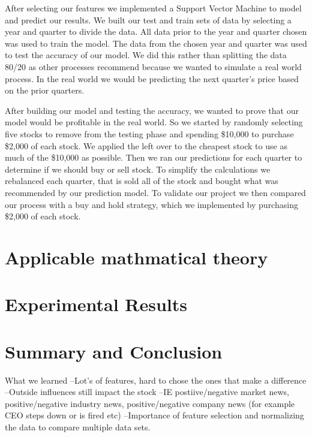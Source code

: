 \documentclass[conference]{IEEEtran}
\begin{document}
After selecting our features we implemented a Support Vector Machine to model and predict our results.  We built our test and train sets of data by selecting a year and quarter to divide the data.  All data prior to the year and quarter chosen was used to train the model. The data from the chosen year and quarter was used to test the accuracy of our model.  We did this rather than splitting the data 80/20 as other processes recommend because we wanted to simulate a real world process.  In the real world we would be predicting the next quarter's price based on the prior quarters.  

After building our model and testing the accuracy, we wanted to prove that our model would be profitable in the real world.  So we started by randomly selecting five stocks to remove from the testing phase and spending \$10,000 to purchase \$2,000 of each stock.  We applied the left over to the cheapest stock to use as much of the \$10,000 as possible. Then we ran our predictions for each quarter to determine if we should buy or sell stock.  To simplify the calculations we rebalanced each quarter, that is sold all of the stock and bought what was recommended by our prediction model.  To validate our project we then compared our process with a buy and hold strategy, which we implemented by purchasing \$2,000 of each stock.

\section{Applicable mathmatical theory}

\section{Experimental Results}



\section{Summary and Conclusion}

What we learned
--Lot's of features, hard to chose the ones that make a difference
--Outside influences still impact the stock --IE postiive/negative market news, positive/negative industry news, positive/negative company news (for example CEO steps down or is fired etc)
--Importance of feature selection and normalizing the data to compare multiple data sets.
\end{document}
